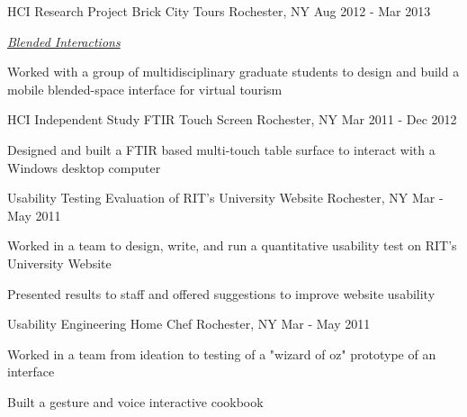 \begin{cventries}
  \cventry
    {HCI Research Project} %
    {Brick City Tours} %
    {Rochester, NY} %
    {Aug 2012 - Mar 2013} %
    {
      \begin{cvitems} %
        \item {\emph{\href{https://blendedinteractions.com/projects/brick-city-tours/}{Blended Interactions}}}
        \item {Worked with a group of multidisciplinary graduate students to design and build a mobile blended-space interface for virtual tourism}
      \end{cvitems}
    }

  \cventry
    {HCI Independent Study} %
    {FTIR Touch Screen} %
    {Rochester, NY} %
    {Mar 2011 - Dec 2012} %
    {
      \begin{cvitems} %
        \item {Designed and built a FTIR based multi-touch table surface to interact with a Windows desktop computer}
      \end{cvitems}
    }

  \cventry
    {Usability Testing} %
    {Evaluation of RIT's University Website} %
    {Rochester, NY} %
    {Mar - May 2011} %
    {
      \begin{cvitems} %
        \item {Worked in a team to design, write, and run a quantitative usability test on RIT's University Website}
        \item {Presented results to staff and offered suggestions to improve website usability}
      \end{cvitems}
    }

  \cventry
    {Usability Engineering} %
    {Home Chef} %
    {Rochester, NY} %
    {Mar - May 2011} %
    {
      \begin{cvitems} %
        \item {Worked in a team from ideation to testing of a "wizard of oz" prototype of an interface}
        \item {Built a gesture and voice interactive cookbook}
      \end{cvitems}
    }


\end{cventries}
